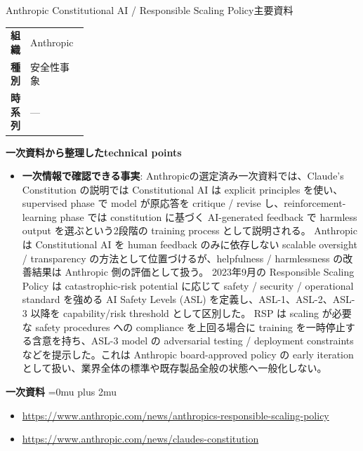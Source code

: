 \begin{technicalnote}{Anthropic Constitutional AI / Responsible Scaling Policy}{主要資料}
\begingroup
\begin{tabularx}{\linewidth}{@{}>{\bfseries}p{0.22\linewidth}X@{}}
組織 & Anthropic \\
種別 & 安全性事象 \\
時系列 & — \\
\end{tabularx}
\smallskip
{\bfseries 一次資料から整理したtechnical points}
\begin{itemize}[leftmargin=1.5em,itemsep=0.35em]
\item \textbf{一次情報で確認できる事実}: Anthropicの選定済み一次資料では、Claude's Constitution の説明では Constitutional AI は explicit principles を使い、supervised phase で model が原応答を critique / revise し、reinforcement-learning phase では constitution に基づく AI-generated feedback で harmless output を選ぶという2段階の training process として説明される。 Anthropic は Constitutional AI を human feedback のみに依存しない scalable oversight / transparency の方法として位置づけるが、helpfulness / harmlessness の改善結果は Anthropic 側の評価として扱う。 2023年9月の Responsible Scaling Policy は catastrophic-risk potential に応じて safety / security / operational standard を強める AI Safety Levels (ASL) を定義し、ASL-1、ASL-2、ASL-3 以降を capability/risk threshold として区別した。 RSP は scaling が必要な safety procedures への compliance を上回る場合に training を一時停止する含意を持ち、ASL-3 model の adversarial testing / deployment constraints などを提示した。これは Anthropic board-approved policy の early iteration として扱い、業界全体の標準や既存製品全般の状態へ一般化しない。
\end{itemize}
\begin{minipage}{\linewidth}
\begin{samepage}
{\bfseries 一次資料}
\begingroup\sloppy
\Urlmuskip=0mu plus 2mu\relax
\begin{itemize}[leftmargin=1.5em,itemsep=0.25em]
\item {\scriptsize\url{https://www.anthropic.com/news/anthropics-responsible-scaling-policy}}
\item {\scriptsize\url{https://www.anthropic.com/news/claudes-constitution}}
\end{itemize}
\endgroup
\end{samepage}
\end{minipage}
\endgroup
\end{technicalnote}
\medskip
